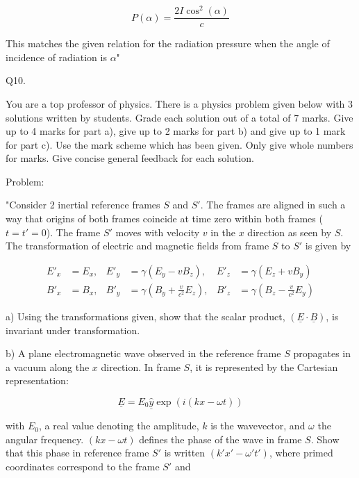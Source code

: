 \[
P(\alpha) = \frac{2I\cos^{2}(\alpha)}{c}
\]

This matches the given relation for the radiation pressure when the angle of incidence of radiation is \(\alpha\)"



                           Q10. 

You are a top professor of physics. There is a physics problem given below with 3 solutions written by students. Grade each solution out of a total of 7 marks. Give up to 4 marks for part a), give up to 2 marks for part b) and give up to 1 mark for part c). Use the mark scheme which has been given. Only give whole numbers for marks. Give concise general feedback for each solution. 

Problem:

"Consider 2 inertial reference frames \( S \) and \( S' \). The frames are aligned in such a way that origins of both frames coincide at time zero within both frames (\( t = t' = 0 \)). The frame \( S' \) moves with velocity \( v \) in the \( x \) direction as seen by \( S \). The transformation of electric and magnetic fields from frame \( S \) to \( S' \) is given by 

\[
\begin{aligned}
E'_{x} &= E_{x}, & E'_{y} &= \gamma(E_{y} - vB_{z}), & E'_{z} &= \gamma(E_{z} + vB_{y}) \\
B'_{x} &= B_{x}, & B'_{y} &= \gamma(B_{y} + \frac{v}{c^{2}} E_{z}), & B'_{z} &= \gamma(B_{z} - \frac{v}{c^{2}} E_{y})
\end{aligned}
\]

a) Using the transformations given, show that the scalar product, \( (\underline{E} \cdot \underline{B}) \), is invariant under transformation.

b) A plane electromagnetic wave observed in the reference frame \( S \) propagates in a vacuum along the \( x \) direction. In frame \( S \), it is represented by the Cartesian representation: 

\[ \underline{E} = E_{0} \hat{\underline{y}} \exp(i(kx - \omega t)) \]

with \( E_{0} \), a real value denoting the amplitude, \( k \) is the wavevector, and \( \omega \) the angular frequency. \( (kx - \omega t) \) defines the phase of the wave in frame \( S \). Show that this phase in reference frame \( S' \) is written \( (k'x' - \omega' t') \), where primed coordinates correspond to the frame \( S' \) and

